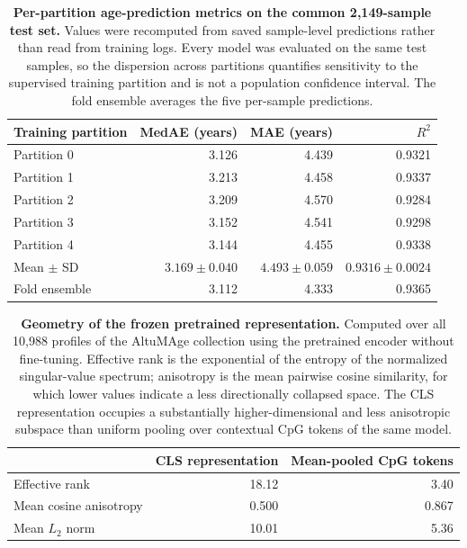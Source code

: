 \clearpage
\begin{table}[!htbp]
\centering
\caption{\textbf{Per-partition age-prediction metrics on the common 2,149-sample test set.}
Values were recomputed from saved sample-level predictions rather than read from training logs.
Every model was evaluated on the same test samples, so the dispersion across partitions
quantifies sensitivity to the supervised training partition and is not a population confidence
interval. The fold ensemble averages the five per-sample predictions.}
\label{tab:sup-folds}
\begin{tabular}{lrrr}
\toprule
Training partition & MedAE (years) & MAE (years) & $R^2$ \\
\midrule
Partition 0 & 3.126 & 4.439 & 0.9321 \\
Partition 1 & 3.213 & 4.458 & 0.9337 \\
Partition 2 & 3.209 & 4.570 & 0.9284 \\
Partition 3 & 3.152 & 4.541 & 0.9298 \\
Partition 4 & 3.144 & 4.455 & 0.9338 \\
\midrule
Mean $\pm$ SD & $3.169\pm0.040$ & $4.493\pm0.059$ & $0.9316\pm0.0024$ \\
Fold ensemble & 3.112 & 4.333 & 0.9365 \\
\bottomrule
\end{tabular}
\end{table}

\begin{table}[!htbp]
\centering
\caption{\textbf{Geometry of the frozen pretrained representation.}
Computed over all 10,988 profiles of the AltuMAge collection using the pretrained encoder
without fine-tuning. Effective rank is the exponential of the entropy of the normalized
singular-value spectrum; anisotropy is the mean pairwise cosine similarity, for which lower
values indicate a less directionally collapsed space. The CLS representation occupies a
substantially higher-dimensional and less anisotropic subspace than uniform pooling over
contextual CpG tokens of the same model.}
\label{tab:sup-geometry}
\begin{tabular}{lrr}
\toprule
 & CLS representation & Mean-pooled CpG tokens \\
\midrule
Effective rank & 18.12 & 3.40 \\
Mean cosine anisotropy & 0.500 & 0.867 \\
Mean $L_2$ norm & 10.01 & 5.36 \\
\bottomrule
\end{tabular}
\end{table}


